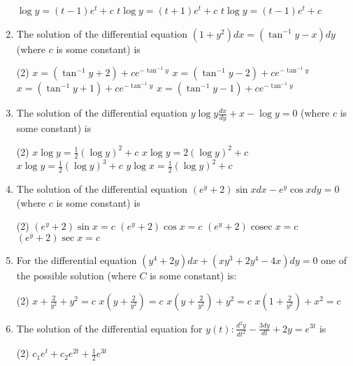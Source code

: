 \begin{enumerate}
\begin{tasks}
		\task[\textbf{b.}]$\log y=(t-1) e^{t}+c$
		\task[\textbf{c.}]$t \log y=(t+1) e^{t}+c$
		\task[\textbf{d.}] $t \log y=(t-1) e^{t}+c$
	\end{tasks}
	\item The solution of the differential equation
	$\left(1+y^{2}\right) d x=\left(\tan ^{-1} y-x\right) d y$ (where $c$ is some constant) is
	 \begin{tasks}(2)
		\task[\textbf{a.}] $x=\left(\tan ^{-1} y+2\right)+c e^{-\tan ^{-1} y}$
		\task[\textbf{b.}] $x=\left(\tan ^{-1} y-2\right)+c e^{-\tan ^{-1} y}$
		\task[\textbf{c.}] $x=\left(\tan ^{-1} y+1\right)+c e^{-\tan ^{-1} y}$
		\task[\textbf{d.}]  $x=\left(\tan ^{-1} y-1\right)+c e^{-\tan ^{-1}y}$
	\end{tasks}
	\item The solution of the differential equation
	$y \log y \frac{d x}{d y}+x-\log y=0$ (where $c$ is some constant) is
	 \begin{tasks}(2)
		\task[\textbf{a.}]$x \log y=\frac{1}{2}(\log y)^{2}+c$
		\task[\textbf{b.}] $x \log y=2(\log y)^{2}+c$
		\task[\textbf{c.}]$x \log y=\frac{1}{2}(\log y)^{3}+c$
		\task[\textbf{d.}]  $y \log x=\frac{1}{2}(\log y)^{2}+c$
	\end{tasks}
	\item The solution of the differential equation
	$\left(e^{y}+2\right) \sin x d x-e^{y} \cos x d y=0$ (where $c$ is some constant) is
	 \begin{tasks}(2)
		\task[\textbf{a.}]$\left(e^{y}+2\right) \sin x=c$
		\task[\textbf{b.}] $\left(e^{y}+2\right) \cos x=c$
		\task[\textbf{c.}] $\left(e^{y}+2\right) \operatorname{cosec} x=c$
		\task[\textbf{d.}] $\left(e^{y}+2\right) \sec x=c$
	\end{tasks}
	\item For the differential equation $\left(y^{4}+2 y\right) d x+\left(x y^{3}+2 y^{4}-4 x\right) d y=0$ one of the possible solution (where $C$ is some constant) is:
	 \begin{tasks}(2)
		\task[\textbf{a.}]$x+\frac{2}{y^{2}}+y^{2}=c$
		\task[\textbf{b.}] $x\left(y+\frac{2}{y^{2}}\right)=c$
		\task[\textbf{c.}]$x\left(y+\frac{2}{y^{2}}\right)+y^{2}=c$
		\task[\textbf{d.}] $x\left(1+\frac{2}{y^{2}}\right)+x^{2}=c$
	\end{tasks}
	\item The solution of the differential equation for $y(t): \frac{d^{2} y}{d t^{2}}-\frac{3 d y}{d t}+2 y=e^{3 t}$ is
	 \begin{tasks}(2)
		\task[\textbf{a.}] $c_{1} e^{t}+c_{2} e^{2 t}+\frac{1}{2} e^{3 t}$

\end{tasks}
\end{enumerate}
